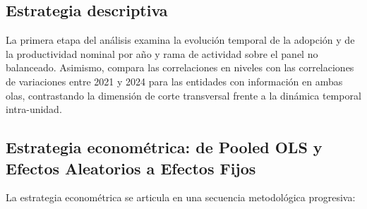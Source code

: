\documentclass[12pt,a4paper]{article}
\begin{document}
\subsection{Estrategia descriptiva}

La primera etapa del análisis examina la evolución temporal de la adopción y de la productividad nominal por año y rama de actividad sobre el panel no balanceado. Asimismo, compara las correlaciones en niveles con las correlaciones de variaciones entre 2021 y 2024 para las entidades con información en ambas olas, contrastando la dimensión de corte transversal frente a la dinámica temporal intra-unidad.

\subsection{Estrategia econométrica: de Pooled OLS y Efectos Aleatorios a Efectos Fijos}

La estrategia econométrica se articula en una secuencia metodológica progresiva:
\end{document}
